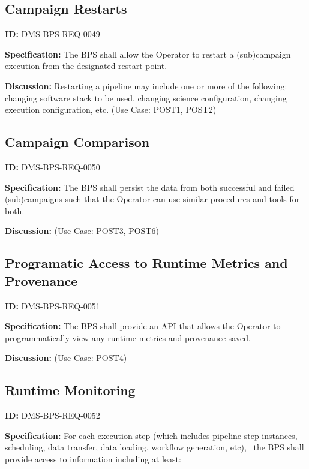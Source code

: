 \documentclass[SE,toc]{lsstdoc}
\begin{document}
\subsection{Campaign Restarts}

\label{DMS-BPS-REQ-0049}
\textbf{ID:} DMS-BPS-REQ-0049

\textbf{Specification:}
The BPS shall allow the Operator to restart a (sub)campaign execution from the designated restart point.

\textbf{Discussion:}
Restarting a pipeline may include one or more of the following: changing software stack to be used, changing science configuration, changing execution configuration, etc.  (Use Case: POST1, POST2)

\subsection{Campaign Comparison}

\label{DMS-BPS-REQ-0050}
\textbf{ID:} DMS-BPS-REQ-0050

\textbf{Specification:}
The BPS shall persist the data from both successful and failed (sub)campaigns such that the Operator can use similar procedures and tools for both.

\textbf{Discussion:}
(Use Case: POST3, POST6)

\subsection{Programatic Access to Runtime Metrics and Provenance}

\label{DMS-BPS-REQ-0051}
\textbf{ID:} DMS-BPS-REQ-0051

\textbf{Specification:}
The BPS shall provide an API that allows the Operator to programmatically view any runtime metrics and provenance saved.

\textbf{Discussion:}
(Use Case: POST4)

\subsection{Runtime Monitoring}

\label{DMS-BPS-REQ-0052}
\textbf{ID:} DMS-BPS-REQ-0052

\textbf{Specification:}
For each execution step (which includes pipeline step instances, scheduling, data transfer, data loading, workflow generation, etc),  the BPS shall provide access to information including at least:
\\
\end{document}
